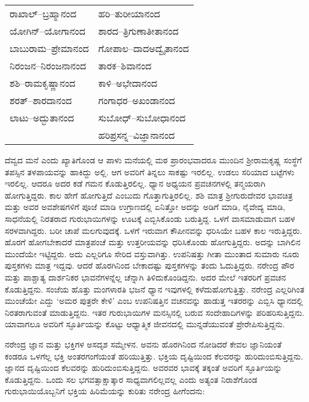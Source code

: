 \begin{longtable}{ll}
ರಾಖಾಲ್–ಬ್ರಹ್ಮಾನಂದ & ಹರಿ–ತುರೀಯಾನಂದ \\
ಯೋಗಿನ್–ಯೋಗಾನಂದ & ಶಾರದ–ತ್ರಿಗುಣಾತೀತಾನಂದ \\
ಬಾಬುರಾಮ–ಪ್ರೇಮಾನಂದ & ಗೋಪಾಲ–ದಾದಅದ್ವೈತಾನಂದ \\
ನಿರಂಜನ–ನಿರಂಜನಾನಂದ & ತಾರಕ–ಶಿವಾನಂದ \\
ಶಶಿ–ರಾಮಕೃಷ್ಣಾನಂದ & ಕಾಳಿ–ಅಭೇದಾನಂದ \\
ಶರತ್–ಶಾರದಾನಂದ & ಗಂಗಾಧರ–ಅಖಂಡಾನಂದ \\
ಲಾಟು–ಅದ್ಭುತಾನಂದ & ಸುಬೋಧ್–ಸುಬೋಧಾನಂದ \\
 & ಹರಿಪ್ರಸನ್ನ–ವಿಜ್ಞಾನಾನಂದ \\
\end{longtable}

ದೆವ್ವದ ಮನೆ ಎಂದು ಖ್ಯಾತಿಗೊಂಡ ಆ ಪಾಳು ಮನೆಯಲ್ಲಿ ಮಠ ಪ್ರಾರಂಭವಾದರೂ ಮುಂದಿನ ಶ‍್ರೀರಾಮಕೃಷ್ಣ ಸಂಸ್ಥೆಗೆ ತಪಸ್ಸಿನ ತಳಪಾಯವನ್ನು ಹಾಕಿದ್ದು ಅಲ್ಲಿ. ಆಗ ಅವರಿಗೆ ತಿನ್ನಲು ಸಾಕಷ್ಟು ಇರಲಿಲ್ಲ. ಉಡಲು ಸರಿಯಾದ ಬಟ್ಟೆಗಳು ಇರಲಿಲ್ಲ. ಆದರೂ ಅದರ ಕಡೆ ಗಮನ ಕೊಡುತ್ತಿರಲಿಲ್ಲ. ಧ್ಯಾನ ಅಧ್ಯಯನ ಪ್ರವಚನಗಳಲ್ಲಿ ತನ್ಮಯರಾಗಿ ಹೋಗುತ್ತಿದ್ದರು. ಕಾಲ ಹೇಗೆ ಹೋಗುತ್ತಿದೆ ಎಂಬುದು ಗೊತ್ತಾಗುತ್ತಿರಲಿಲ್ಲ. ಶಶಿ ಮಾತ್ರ ಶ‍್ರೀಗುರುದೇವರ ಭಾವಚಿತ್ರ ಮತ್ತು ಅವರ ಅವಶೇಷಗಳಿಗೆ ಪೂಜೆ ಮಾಡಿ ಉಗ್ರಾಣದಲ್ಲಿ ಏನಿತ್ತೋ ಅದನ್ನು ಅಡಿಗೆ ಮಾಡಿ, ನೈವೇದ್ಯ ಮಾಡಿ, ಸಾಧನೆಯಲ್ಲಿ ನಿರತರಾದ ಗುರುಭಾಯಿಗಳನ್ನು ಊಟಕ್ಕೆ ಎಬ್ಬಿಸಿಕೊಂಡು ಬರುತ್ತಿದ್ದ. ಒಳಗೆ ವಾಸಮಾಡುವಾಗ ಬಹಳ ಸರಳವಾಗಿದ್ದರು. ಬರೀ ಚಾಪೆ ಮಲಗುವುದಕ್ಕೆ. ಒಳಗೆ ಇರುವಾಗ ಕೌಪೀನವನ್ನು ಧರಿಸಿಯೇ ಬಹಳ ಕಾಲ ಇರುತ್ತಿದ್ದರು. ಹೊರಗೆ ಹೋಗಬೇಕಾದರೆ ಮಾತ್ರಪಂಚೆ ಮತ್ತು ಉತ್ತರೀಯವನ್ನು ಧರಿಸಿಕೊಂಡು ಹೋಗುತ್ತಿದ್ದರು. ಅದನ್ನು ಬಾಗಿಲಿನ ಮುಂದೆಯೇ ಇಟ್ಟಿದ್ದರು. ಅದು ಎಲ್ಲರಿಗೂ ಸೇರಿದ ವಸ್ತುವಾಗಿತ್ತು. ಉಪನಿಷತ್ತು ಗೀತಾ ಮುಂತಾದ ಸುಮಾರು ನೂರು ಪುಸ್ತಕಗಳು ಮಾತ್ರ ಇದ್ದವು. ಆದರೆ ಹೊರಗಿನಿಂದ ಬೇಕಾದಷ್ಟು ಪುಸ್ತಕಗಳನ್ನು ತಂದು ಓದುತ್ತಿದ್ದರು. ನರೇಂದ್ರ ಪೌರ ಮತ್ತು ಪಾಶ್ಚಾತ್ಯ ದಾರ್ಶನಿಕರ ಭಾವನೆಗಳನ್ನೆಲ್ಲ ಚೆನ್ನಾಗಿ ತಿಳಿದುಕೊಂಡಿದ್ದನು. ಅದರ ಮೇಲೆ ಇತರರಿಗೆ ಪ್ರವಚನ ಕೊಡುತ್ತಿದ್ದನು. ಸಂಜೆಯ ಹೊತ್ತು ಮಂಗಳಾರತಿ ಭಜನೆ ಧ್ಯಾನ ಇವುಗಳಲ್ಲಿ ಕಳೆದುಹೋಗುತ್ತಿತ್ತು. ನರೇಂದ್ರ ಎಲ್ಲರಿಗಿಂತ ಮುಂಚೆಯೇ ಎದ್ದು ‘ಅಮರ ಪುತ್ರರೇ ಕೇಳಿ’ ಎಂಬ ಉಪನಿಷತ್ತಿನ ವಚನವನ್ನು ಹಾಡುತ್ತ ಇತರರನ್ನು ಎಬ್ಬಿಸಿ ಧ್ಯಾನದಲ್ಲಿ ನಿರತರಾಗುವಂತೆ ಮಾಡುತ್ತಿದ್ದನು. ಇತರ ಗುರುಭಾಯಿಗಳ ಮನಸ್ಸಿನಲ್ಲಿ ಬರುವ ಸಂದೇಹಾದಿಗಳನ್ನು ಪರಿಹರಿಸುತ್ತಿದ್ದನು. ಯಾವಾಗಲೂ ಅವರಿಗೆ ಸ್ಫೂರ್ತಿಯನ್ನು ಕೊಟ್ಟು ಆಧ್ಯಾತ್ಮಿಕ ಜೀವನದಲ್ಲಿ ಮುನ್ನಡೆಯುವಂತೆ ಪ್ರೇರೇಪಿಸುತ್ತಿದ್ದನು.

ನರೇಂದ್ರ ಜ್ಞಾನ ಮತ್ತು ಭಕ್ತಿಗಳ ಅಸದೃಶ ಸಮ್ಮೇಳನ. ಅವನು ಹೊರಗಿನಿಂದ ನೋಡಿದರೆ ಕೇವಲ ಜ್ಞಾನಿಯಂತೆ ಕಂಡರೂ ಒಳಗೆಲ್ಲ ಭಕ್ತಿ ಅಂತರಗಂಗೆಯಂತೆ ಹರಿಯುತ್ತಿತ್ತು. ಭಕ್ತಿಯ ದೃಷ್ಟಿಯಿಂದ ಕೆಲವರನ್ನು ಹುರಿದುಂಬಿಸುತ್ತಿದ್ದನು. ಜ್ಞಾನದ ದೃಷ್ಟಿಯಿಂದ ಕೆಲವರನ್ನು ಹುರಿದುಂಬಿಸುತ್ತಿದ್ದನು. ಅವರವರ ಭಾವಕ್ಕೆ ತಕ್ಕಂತೆ ಅವರಿಗೆ ಸ್ಫೂರ್ತಿಯನ್ನು ಕೊಡುತ್ತಿದ್ದನು. ಒಂದು ಸಲ ಭಗವತ್ಸಾಕ್ಷಾತ್ಕಾರ ಸಾಧ್ಯವಾಗಲಿಲ್ಲವಲ್ಲ ಎಂದು ಅತ್ಯಂತ ನಿರಾಶೆಗೊಂಡ ಗುರುಭಾಯಿಯೊಬ್ಬನಿಗೆ ಭಕ್ತಿಯ ಹಿರಿಮೆಯನ್ನು ಕುರಿತು ನರೇಂದ್ರ ಹೀಗೆಂದನು:

